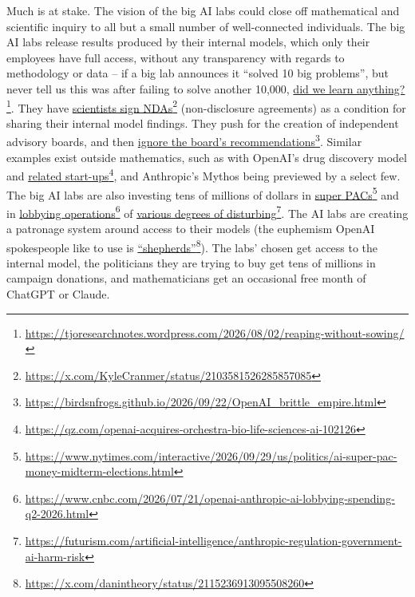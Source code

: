 \documentclass[11pt]{amsart}
\begin{document}
Much is at stake. The vision of the big AI labs could close off mathematical and scientific inquiry to all but a small number of well-connected individuals. The big AI labs release results produced by their internal models, which only their employees have full access, without any transparency with regards to methodology or data -- if a big lab announces it ``solved 10 big problems'', but never tell us this was after failing to solve another 10,000, \href{https://tjoresearchnotes.wordpress.com/2026/08/02/reaping-without-sowing/}{did we learn anything?}\footnote{\url{https://tjoresearchnotes.wordpress.com/2026/08/02/reaping-without-sowing/}}. They have \href{https://x.com/KyleCranmer/status/2103581526285857085}{scientists sign NDAs}\footnote{\url{https://x.com/KyleCranmer/status/2103581526285857085}} (non-disclosure agreements) as a condition for sharing their internal model findings. They push for the creation of independent advisory boards, and then \href{https://birdsnfrogs.github.io/2026/09/22/OpenAI_brittle_empire.html}{ignore the board's recommendations}\footnote{\url{https://birdsnfrogs.github.io/2026/09/22/OpenAI_brittle_empire.html}}. Similar examples exist outside mathematics, such as with OpenAI's drug discovery model and \href{https://qz.com/openai-acquires-orchestra-bio-life-sciences-ai-102126}{related start-ups}\footnote{\url{https://qz.com/openai-acquires-orchestra-bio-life-sciences-ai-102126}}, and Anthropic's Mythos being previewed by a select few. The big AI labs are also investing tens of millions of dollars in \href{https://www.nytimes.com/interactive/2026/09/29/us/politics/ai-super-pac-money-midterm-elections.html}{super PACs}\footnote{\url{https://www.nytimes.com/interactive/2026/09/29/us/politics/ai-super-pac-money-midterm-elections.html}} and in \href{https://www.cnbc.com/2026/07/21/openai-anthropic-ai-lobbying-spending-q2-2026.html}{lobbying operations}\footnote{\url{https://www.cnbc.com/2026/07/21/openai-anthropic-ai-lobbying-spending-q2-2026.html}} of \href{https://futurism.com/artificial-intelligence/anthropic-regulation-government-ai-harm-risk}{various degrees of disturbing}\footnote{\url{https://futurism.com/artificial-intelligence/anthropic-regulation-government-ai-harm-risk}}. The AI labs are creating a patronage system around access to their models (the euphemism OpenAI spokespeople like to use is \href{https://x.com/danintheory/status/2115236913095508260}{``shepherds''}\footnote{\url{https://x.com/danintheory/status/2115236913095508260}}). The labs' chosen get access to the internal model, the politicians they are trying to buy get tens of millions in campaign donations, and mathematicians get an occasional free month of ChatGPT or Claude.
\end{document}
